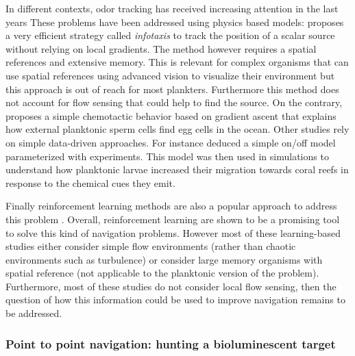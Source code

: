 In different contexts, odor tracking has received increasing attention in the last years
These problems have been addressed using physics based models: \citet{vergassola2007infotaxis} proposes a very efficient strategy called \textit{infotaxis} to track the position of a scalar source without relying on local gradients.
The method however requires a spatial references and extensive memory.
This is relevant for complex organisms that can use spatial references using advanced vision to visualize their environment but this approach is out of reach for most plankters.
Furthermore this method does not account for flow sensing that could help to find the source.
On the contrary, \citet{lange2021sperm} proposes a simple chemotactic behavior based on gradient ascent that explains how external planktonic sperm cells find egg cells in the ocean.
Other studies rely on simple data-driven approaches. For instance \citet{koehl2007individual} deduced a simple on/off model parameterized with experiments.
This model was then used in simulations to understand how planktonic larvae increased their migration towards coral reefs in response to the chemical cues they emit.

Finally reinforcement learning methods are also a popular approach to address this problem \citep{lu2011learning, fischer2017odor, liberzon2018moth, jing2021recent, loisy2022searching, rigolli2022learning}.
Overall, reinforcement learning are shown to be a promising tool to solve this kind of navigation problems.
However most of these learning-based studies either consider simple flow environments (rather than chaotic environments such as turbulence) or consider large memory organisms with spatial reference (not applicable to the planktonic version of the problem).
Furthermore, most of these studies do not consider local flow sensing, then the question of how this information could be used to improve navigation remains to be addressed.

\subsubsection{Point to point navigation: hunting a bioluminescent target}

